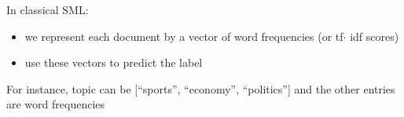 \documentclass[compress]{beamer}
\begin{document}
\begin{frame}{In classical SML:}
\begin{itemize}[<+->]
	\item we represent each document by a vector of word frequencies (or tf$\cdot$ idf scores)
	\item use these vectors to predict the label
\end{itemize}
\end{frame}


\begin{frame}[plain]
	\begin{table}[]
\raggedright	
	For instance, topic can be [``sports'', ``economy'', ``politics''] and the other entries are word frequencies
	\end{table}
\end{frame}
\end{document}
